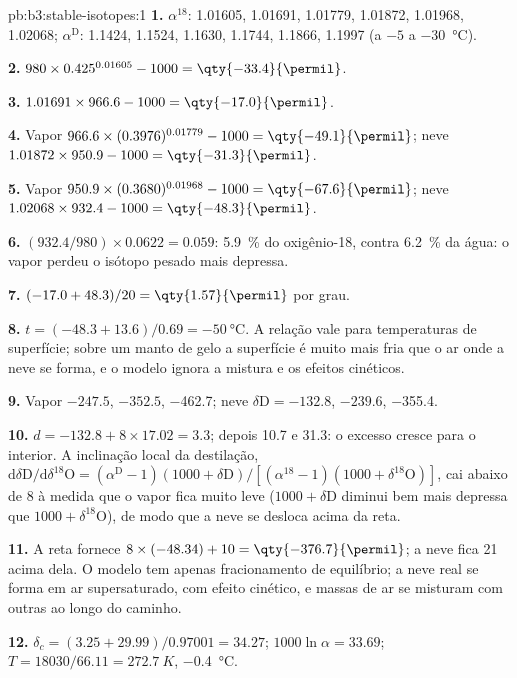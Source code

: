\begin{solution}{pb:b3:stable-isotopes:1}
\textbf{1.} $\alpha^{18}$: 1.01605, 1.01691, 1.01779, 1.01872, 1.01968,
1.02068; $\alpha^{\mathrm D}$: 1.1424, 1.1524, 1.1630, 1.1744, 1.1866, 1.1997
(a $-5$ a \qty{-30}{\celsius}).

\textbf{2.} $980\times0.425^{0.01605} - 1000 = \qty{-33.4}{\permil}$.

\textbf{3.} $1.01691\times966.6 - 1000 = \qty{-17.0}{\permil}$.

\textbf{4.} Vapor $966.6\times(0.3976)^{0.01779} - 1000 = \qty{-49.1}{\permil}$;
neve $1.01872\times950.9 - 1000 = \qty{-31.3}{\permil}$.

\textbf{5.} Vapor $950.9\times(0.3680)^{0.01968} - 1000 = \qty{-67.6}{\permil}$;
neve $1.02068\times932.4 - 1000 = \qty{-48.3}{\permil}$.

\textbf{6.} $(932.4/980)\times0.0622 = 0.059$: \qty{5.9}{\percent} do
oxigênio-18, contra \qty{6.2}{\percent} da água: o vapor perdeu o isótopo pesado
mais depressa.

\textbf{7.} $(-17.0 + 48.3)/20 = \qty{1.57}{\permil}$ por grau.

\textbf{8.} $t = (-48.3 + 13.6)/0.69 = \qty{-50}{\celsius}$. A relação vale
para temperaturas de superfície; sobre um manto de gelo a superfície é muito mais fria que o
ar onde a neve se forma, e o modelo ignora a mistura e os efeitos cinéticos.

\textbf{9.} Vapor $-247.5$, $-352.5$, \qty{-462.7}{\permil}; neve $\delta\mathrm D
= -132.8$, $-239.6$, \qty{-355.4}{\permil}.

\textbf{10.} $d = -132.8 + 8\times17.02 = 3.3$; depois 10.7 e
\qty{31.3}{\permil}: o excesso cresce para o interior. A inclinação local da
destilação, $\mathrm d\delta\mathrm D/\mathrm d\delta^{18}\mathrm O = (\alpha^{\mathrm D} -
1)(1000 + \delta\mathrm D)/[(\alpha^{18} - 1)(1000 + \delta^{18}\mathrm O)]$, cai abaixo de
8 à medida que o vapor fica muito leve ($1000 + \delta\mathrm D$ diminui bem mais depressa que
$1000 + \delta^{18}\mathrm O$), de modo que a neve se desloca acima da reta.

\textbf{11.} A reta fornece $8\times(-48.34) + 10 = \qty{-376.7}{\permil}$; a
neve fica \qty{21}{\permil} acima dela. O modelo tem apenas fracionamento de equilíbrio;
a neve real se forma em ar supersaturado, com efeito cinético,
e massas de ar se misturam com outras ao longo do caminho.

\textbf{12.} $\delta_c = (3.25 + 29.99)/0.97001 = 34.27$; $1000\ln\alpha =
33.69$; $T = 18030/66.11 = \qty{272.7}{K}$, \qty{-0.4}{\celsius}.


\end{solution}
